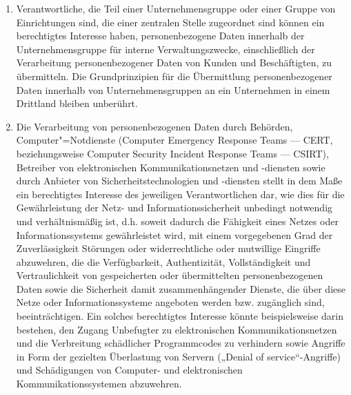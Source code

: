 \begin{enumerate}

   \item Verantwortliche, die Teil einer Unternehmensgruppe oder einer Gruppe von Einrichtungen sind, die einer
    zentralen Stelle zugeordnet sind können ein berechtigtes Interesse haben, personenbezogene Daten innerhalb der
    Unternehmensgruppe für interne Verwaltungszwecke, einschließlich der Verarbeitung personenbezogener Daten von
    Kunden und Beschäftigten, zu übermitteln. Die Grundprinzipien für die Übermittlung personenbezogener Daten
    innerhalb von Unternehmensgruppen an ein Unternehmen in einem Drittland bleiben unberührt.%
   \label{eg:48}
   

   \item Die Verarbeitung von personenbezogenen Daten durch Behörden, Computer"=Notdienste (Computer Emergency Response
    Teams — CERT, beziehungsweise Computer Security Incident Response Teams — CSIRT), Betreiber von elektronischen
    Kommunikationsnetzen und -diensten sowie durch Anbieter von Sicherheitstechnologien und -diensten stellt in dem
    Maße ein berechtigtes Interesse des jeweiligen Verantwortlichen dar, wie dies für die Gewährleistung der Netz- und
    Informationssicherheit unbedingt notwendig und verhältnismäßig ist, d.h. soweit dadurch die Fähigkeit eines Netzes
    oder Informationssystems gewährleistet wird, mit einem vorgegebenen Grad der Zuverlässigkeit Störungen oder
    widerrechtliche oder mutwillige Eingriffe abzuwehren, die die Verfügbarkeit, Authentizität, Vollständigkeit und
    Vertraulichkeit von gespeicherten oder übermittelten personenbezogenen Daten sowie die Sicherheit damit
    zusammenhängender Dienste, die über diese Netze oder Informationssysteme angeboten werden bzw. zugänglich sind,
    beeinträchtigen. Ein solches berechtigtes Interesse könnte beispielsweise darin bestehen, den Zugang Unbefugter zu
    elektronischen Kommunikationsnetzen und die Verbreitung schädlicher Programmcodes zu verhindern sowie Angriffe in
    Form der gezielten Überlastung von Servern („Denial of service“-Angriffe) und Schädigungen von Computer- und
    elektronischen Kommunikationssystemen abzuwehren.%
   \label{eg:49}
   


\end{enumerate}
